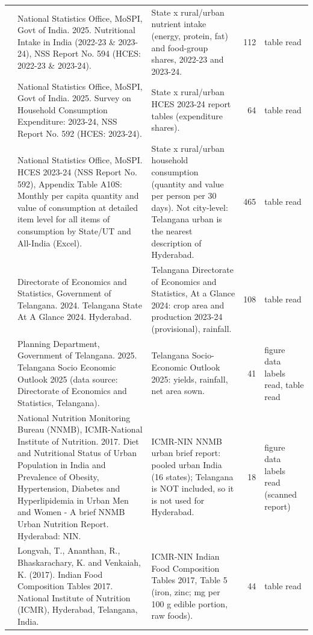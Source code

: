 {\begin{longtable}{L{0.140}L{0.343}L{0.330}rL{0.102}}
 & National Statistics Office, MoSPI, Govt of India. 2025. Nutritional Intake in India (2022-23 \& 2023-24), NSS Report No. 594 (HCES: 2022-23 \& 2023-24). & State x rural/urban nutrient intake (energy, protein, fat) and food-group shares, 2022-23 and 2023-24. & 112 & table read \\
 & National Statistics Office, MoSPI, Govt of India. 2025. Survey on Household Consumption Expenditure: 2023-24, NSS Report No. 592 (HCES: 2023-24). & State x rural/urban HCES 2023-24 report tables (expenditure shares). & 64 & table read \\
 & National Statistics Office, MoSPI. HCES 2023-24 (NSS Report No. 592), Appendix Table A10S: Monthly per capita quantity and value of consumption at detailed item level for all items of consumption by State/UT and All-India (Excel). & State x rural/urban household consumption (quantity and value per person per 30 days). Not city-level: Telangana urban is the nearest description of Hyderabad. & 465 & table read \\
 & Directorate of Economics and Statistics, Government of Telangana. 2024. Telangana State At A Glance 2024. Hyderabad. & Telangana Directorate of Economics and Statistics, At a Glance 2024: crop area and production 2023-24 (provisional), rainfall. & 108 & table read \\
 & Planning Department, Government of Telangana. 2025. Telangana Socio Economic Outlook 2025 (data source: Directorate of Economics and Statistics, Telangana). & Telangana Socio-Economic Outlook 2025: yields, rainfall, net area sown. & 41 & figure data labels read, table read \\
 & National Nutrition Monitoring Bureau (NNMB), ICMR-National Institute of Nutrition. 2017. Diet and Nutritional Status of Urban Population in India and Prevalence of Obesity, Hypertension, Diabetes and Hyperlipidemia in Urban Men and Women - A brief NNMB Urban Nutrition Report. Hyderabad: NIN. & ICMR-NIN NNMB urban brief report: pooled urban India (16 states); Telangana is NOT included, so it is not used for Hyderabad. & 18 & figure data labels read (scanned report) \\
 & Longvah, T., Ananthan, R., Bhaskarachary, K. and Venkaiah, K. (2017). Indian Food Composition Tables 2017. National Institute of Nutrition (ICMR), Hyderabad, Telangana, India. & ICMR-NIN Indian Food Composition Tables 2017, Table 5 (iron, zinc; mg per 100 g edible portion, raw foods). & 44 & table read \\
\end{longtable}}

